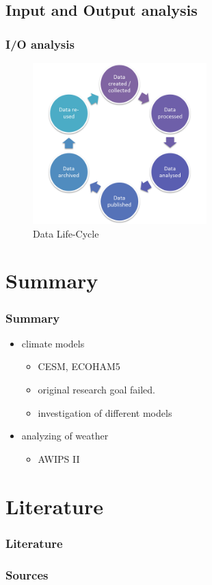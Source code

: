 \documentclass[compress]{beamer}
\begin{document}
\subsection{Input and Output analysis}
\begin{frame}[fragile]
	\frametitle{I/O analysis}
	\begin{center}
	\begin{figure}
	\includegraphics[width=0.6\textwidth]{gfx/DataLifecycle.png}
	\caption[]{Data Life-Cycle \cite{LanUni}}
	\end{figure}
	\end{center}

\end{frame}


\section{Summary}

\begin{frame}
	\frametitle{Summary}

	\begin{itemize}
		\item climate models
		\begin{itemize}
			\item CESM, ECOHAM5
			\item original research goal failed.
			\item investigation of different models
		\end{itemize}

		\item analyzing of weather
		\begin{itemize}
		    \item AWIPS II
		\end{itemize}
	\end{itemize}
\end{frame}

\section*{Literature}

\begin{frame}[allowframebreaks]
	\frametitle{Literature}
    \frametitle{Sources}

	
	
\end{frame}
\end{document}
